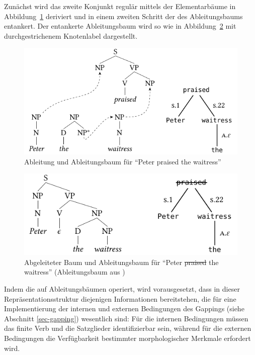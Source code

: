 Zunächst wird das zweite Konjunkt regulär mittels der Elementarbäume in Abbildung~\ref{fig-deanchoring-1} deriviert und in einem zweiten Schritt der  des Ableitungsbaums entankert. Der entankerte Ableitungsbaum wird so wie in Abbildung~\ref{fig-deanchoring-2} mit durchgestrichenem Knotenlabel dargestellt. 

\begin{figure}[t]
\centering
\includegraphics{graphics/abb814.pdf}
\caption{\label{fig-deanchoring-1}Ableitung und Ableitungsbaum für "`Peter praised the waitress"' \citep[Figure~4]{Lichte:Kallmeyer:10}}
\end{figure}
 

\begin{figure}[t]
\centering
\includegraphics{graphics/abb815.pdf}
\caption{\label{fig-deanchoring-2}Abgeleiteter Baum und Ableitungsbaum für "`Peter \sout{praised} the waitress"' (Ableitungsbaum aus \citealt[Figure~2]{Lichte:Kallmeyer:10})}
\end{figure}

Indem die  auf Ableitungsbäumen operiert, wird vorausgesetzt, dass in dieser Repräsentationsstruktur diejenigen Informationen bereitstehen, die für eine Implementierung der internen und externen Bedingungen des Gappings (siehe Abschnitt \ref{sec-gapping}) wesentlich sind: Für die internen Bedingungen müssen das finite Verb und die Satzglieder identifizierbar sein, während für die externen Bedingungen die Verfügbarkeit bestimmter morphologischer Merkmale erfordert wird.

